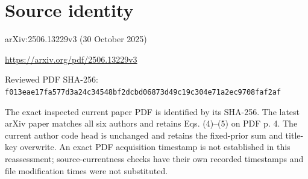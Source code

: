 \documentclass[11pt]{article}
\begin{document}
\section*{Source identity}

arXiv:2506.13229v3 (30 October 2025)

\url{https://arxiv.org/pdf/2506.13229v3}

Reviewed PDF SHA-256: \nolinkurl{f013eae17fa577d3a24c34548bf2dcbd06873d49c19c304e71a2ec9708faf2af}

The exact inspected current paper PDF is identified by its SHA-256. The latest arXiv paper matches all six authors and retains Eqs. (4)–(5) on PDF p. 4. The current author code head is unchanged and retains the fixed-prior sum and title-key overwrite. An exact PDF acquisition timestamp is not established in this reassessment; source-currentness checks have their own recorded timestamps and file modification times were not substituted.
\end{document}
